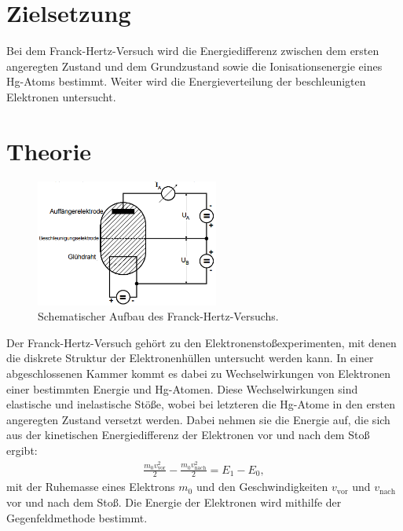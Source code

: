 \section{Zielsetzung}
\label{sec:Zielsetzung}
Bei dem Franck-Hertz-Versuch wird die Energiedifferenz
zwischen dem ersten angeregten Zustand und dem Grundzustand sowie die Ionisationsenergie eines
Hg-Atoms bestimmt. Weiter wird die Energieverteilung der beschleunigten Elektronen untersucht.


\section{Theorie}
\label{sec:Theorie}
\begin{figure}
  \includegraphics[width=6cm]{aufbau.png}
  \caption{Schematischer Aufbau des Franck-Hertz-Versuchs. \cite[S.116]{kent}}
\end{figure}
Der Franck-Hertz-Versuch gehört zu den Elektronenstoßexperimenten, mit denen die
diskrete Struktur der Elektronenhüllen untersucht werden kann. In einer abgeschlossenen
 Kammer kommt es dabei zu Wechselwirkungen von Elektronen einer bestimmten Energie und
Hg-Atomen. Diese Wechselwirkungen sind elastische und inelastische Stöße, wobei bei
letzteren die Hg-Atome in den ersten angeregten Zustand versetzt werden. Dabei
nehmen sie die Energie auf, die sich aus der kinetischen Energiedifferenz der Elektronen vor und
nach dem Stoß ergibt:
\begin{align}
\frac{m_\text{0} v_\text{vor}^{2}}{2} - \frac{m_\text{0} v_\text{nach}^{2}}{2} = E_\text{1} - E_\text{0},
\end{align}
mit der Ruhemasse eines Elektrons $m_\text{0}$ und den Geschwindigkeiten $v_\text{vor}$
und $v_\text{nach}$ vor und nach dem Stoß. Die Energie der Elektronen wird mithilfe der
Gegenfeldmethode bestimmt.


